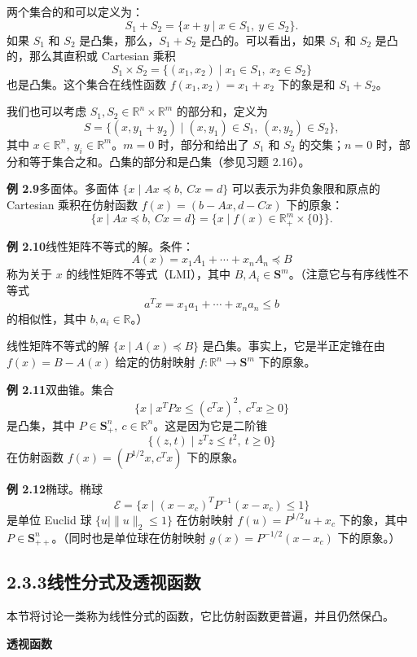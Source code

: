 \documentclass[UTF8,12pt,a4paper,fontset=fandol]{ctexart}
\begin{document}
两个集合的和可以定义为：
\[
  S_1+S_2=\{x+y\mid x\in S_1,\ y\in S_2\}.
\]
如果 $S_1$ 和 $S_2$ 是凸集，那么，$S_1+S_2$ 是凸的。可以看出，如果 $S_1$ 和 $S_2$ 是凸的，那么其直积或 Cartesian 乘积
\[
  S_1\times S_2=\{(x_1,x_2)\mid x_1\in S_1,\ x_2\in S_2\}
\]
也是凸集。这个集合在线性函数 $f(x_1,x_2)=x_1+x_2$ 下的象是和 $S_1+S_2$。

我们也可以考虑 $S_1,S_2\in\mathbb{R}^n\times\mathbb{R}^m$ 的部分和，定义为
\[
  S=\{(x,y_1+y_2)\mid (x,y_1)\in S_1,\ (x,y_2)\in S_2\},
\]
其中 $x\in\mathbb{R}^n,\ y_i\in\mathbb{R}^m$。$m=0$ 时，部分和给出了 $S_1$ 和 $S_2$ 的交集；$n=0$ 时，部分和等于集合之和。凸集的部分和是凸集（参见习题 2.16）。

\noindent\textbf{例 2.9}\quad 多面体。多面体 $\{x\mid Ax\preceq b,\ Cx=d\}$ 可以表示为非负象限和原点的 Cartesian 乘积在仿射函数 $f(x)=(b-Ax,d-Cx)$ 下的原象：
\[
  \{x\mid Ax\preceq b,\ Cx=d\}
  =\{x\mid f(x)\in\mathbb{R}_+^m\times\{0\}\}.
\]

\noindent\textbf{例 2.10}\quad 线性矩阵不等式的解。条件：
\begin{equation}
  A(x)=x_1A_1+\cdots+x_nA_n\preceq B
  \tag{2.11}
\end{equation}
称为关于 $x$ 的线性矩阵不等式（LMI），其中 $B,A_i\in\mathbf{S}^m$。（注意它与有序线性不等式
\[
  a^Tx=x_1a_1+\cdots+x_na_n\le b
\]
的相似性，其中 $b,a_i\in\mathbb{R}$。）

线性矩阵不等式的解 $\{x\mid A(x)\preceq B\}$ 是凸集。事实上，它是半正定锥在由 $f(x)=B-A(x)$ 给定的仿射映射 $f:\mathbb{R}^n\to\mathbf{S}^m$ 下的原象。

\noindent\textbf{例 2.11}\quad 双曲锥。集合
\[
  \{x\mid x^TPx\le (c^Tx)^2,\ c^Tx\ge 0\}
\]
是凸集，其中 $P\in\mathbf{S}_+^n,\ c\in\mathbb{R}^n$。这是因为它是二阶锥
\[
  \{(z,t)\mid z^Tz\le t^2,\ t\ge 0\}
\]
在仿射函数 $f(x)=(P^{1/2}x,c^Tx)$ 下的原象。

\noindent\textbf{例 2.12}\quad 椭球。椭球
\[
  \mathcal{E}=\{x\mid (x-x_c)^TP^{-1}(x-x_c)\le 1\}
\]
是单位 Euclid 球 $\{u\mid \|u\|_2\le 1\}$ 在仿射映射 $f(u)=P^{1/2}u+x_c$ 下的象，其中 $P\in\mathbf{S}_{++}^n$。（同时也是单位球在仿射映射 $g(x)=P^{-1/2}(x-x_c)$ 下的原象。）

\subsection*{2.3.3\quad 线性分式及透视函数}

本节将讨论一类称为线性分式的函数，它比仿射函数更普遍，并且仍然保凸。

\noindent\textbf{透视函数}
\end{document}
